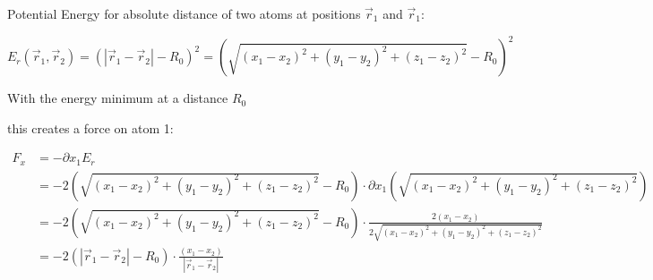 \documentclass[a4paper]{article}
\begin{document}
Potential Energy for absolute distance of two atoms at positions $\vec{r}_1$ and $\vec{r}_1$:

\[E_r (\vec{r}_1, \vec{r}_2) = (|\vec{r}_1-\vec{r}_2|-R_0)^2 = (\sqrt{(x_1-x_2)^2 + (y_1-y_2)^2 + (z_1-z_2)^2}-R_0)^2\]

With the energy minimum at a distance $R_0$

this creates a force on atom 1:

\begin{align*}
F_x &= - \partial x_1 E_r  \\
&= - 2(\sqrt{(x_1-x_2)^2 + (y_1-y_2)^2 + (z_1-z_2)^2}-R_0) \cdot \partial x_1 (\sqrt{(x_1-x_2)^2 + (y_1-y_2)^2 + (z_1-z_2)^2})\\
&=  - 2(\sqrt{(x_1-x_2)^2 + (y_1-y_2)^2 + (z_1-z_2)^2}-R_0) \cdot \frac{2(x_1-x_2)}{2\sqrt{(x_1-x_2)^2 + (y_1-y_2)^2 + (z_1-z_2)^2}}\\
&=- 2(|\vec{r}_1-\vec{r}_2|-R_0) \cdot \frac{(x_1-x_2)}{|\vec{r}_1-\vec{r}_2|}
\end{align*}
\end{document}
